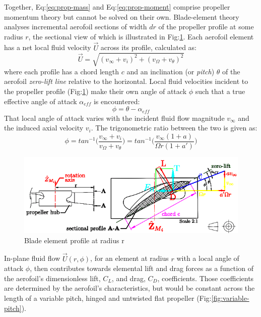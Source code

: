 Together, Eq:\ref{eq:prop-mass} and Eq:\ref{eq:prop-moment} comprise propeller momentum theory but cannot be solved on their own. Blade-element theory analyses incremental aerofoil sections of width $dr$ of the propeller profile  at some radius $r$, the sectional view of which is illustrated in Fig:\ref{fig:bem-profile}. Each aerofoil element has a net local fluid velocity $\vec{U}$ across its profile, calculated as:
\begin{equation}
\vec{U}=\sqrt{(v_\infty+v_i)^2+(v_\Omega+v_\theta)^2}
\end{equation}
where each profile has a chord length $c$ and an inclination (or \emph{pitch}) $\theta$ of the aerofoil \emph{zero-lift line} relative to the horizontal. Local fluid velocities incident to the propeller profile (Fig:\ref{fig:bem-profile}) make their own angle of attack $\phi$ such that a true effective angle of attack $\alpha_{eff}$ is encountered:
\begin{equation}
\phi=\theta-\alpha_{eff}
\end{equation}
That local angle of attack varies with the incident fluid flow magnitude $v_\infty$ and the induced axial velocity $v_i$. The trigonometric ratio between the two is given as:
\begin{equation}
\phi=tan^{-1}\bigg(\frac{v_\infty+v_i}{v_\Omega+v_\theta}\bigg)=tan^{-1}\bigg(\frac{v_\infty(1+a)}{\Omega r(1+a')}\bigg)
\end{equation}
\par
\begin{figure}[hbtp]
\vspace{-15pt}
\centering
\includegraphics[width=\textwidth]{figs/bem-profile}
\caption{Blade element profile at radius r}
\label{fig:bem-profile}
\end{figure}
In-plane fluid flow $\vec{U}(r,\phi)$, for an element at radius $r$ with a local angle of attack $\phi$, then contributes towards elemental lift and drag forces as a function of the aerofoil's dimensionless lift, $C_L$, and drag, $C_D$, coefficients. Those coefficients are determined by the aerofoil's characteristics, but would be constant across the length of a variable pitch, hinged and untwisted flat propeller (Fig:\ref{fig:variable-pitch}).
